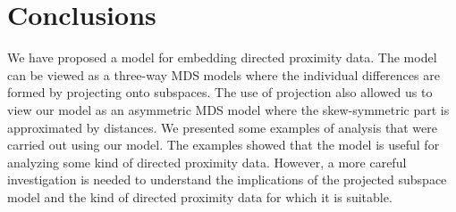 \section{Conclusions}
\label{sec:conclusions}
We have proposed a model for embedding directed proximity data. The
model can be viewed as a three-way MDS models where the individual
differences are formed by projecting onto subspaces. The use of
projection also allowed us to view our model as an asymmetric MDS
model where the skew-symmetric part is approximated by distances. We
presented some examples of analysis that were carried out using our
model. The examples showed that the model is useful for analyzing some
kind of directed proximity data. However, a more careful investigation
is needed to understand the implications of the projected subspace
model and the kind of directed proximity data for which it is
suitable. \\ \\

